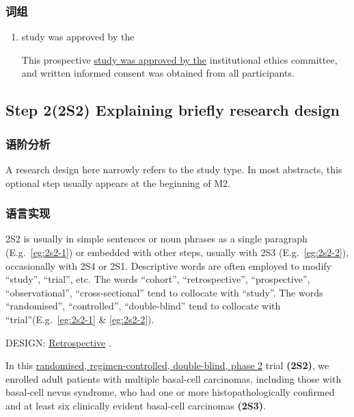 \documentclass[a4paper]{ctexbook}
\begin{document}
    \subsubsection{词组}

    \begin{enumerate}
      \item study was approved by the
      \begin{eg}
        This prospective \uline{study was approved by the} institutional ethics committee, and written informed consent was obtained from all participants.
      \end{eg}
    \end{enumerate}

  \subsection{Step 2(2S2) Explaining briefly research design}

    \subsubsection{语阶分析}

    A research design here narrowly refers to the study type. In most abstracts, this optional step usually appears at the beginning of M2.

    \subsubsection{语言实现}

    2S2 is usually in simple sentences or noun phrases as a single paragraph (E.g.~\ref{eg:2s2-1}) or embedded with other steps, usually with 2S3 (E.g.~\ref{eg:2s2-2}), occasionally with 2S4 or 2S1. Descriptive words are often employed to modify ``study'', ``trial'', etc. The words ``cohort'', ``retrospective'', ``prospective'', ``observational'', ``cross-sectional'' tend to collocate with ``study''. The words ``randomised'', ``controlled'', ``double-blind'' tend to collocate with ``trial''(E.g.~\ref{eg:2s2-1} \& \ref{eg:2s2-2}).

    \begin{eg}[label={eg:2s2-1}]{}
      DESIGN: \uline{Retrospective} .
    \end{eg}

    \begin{eg}[label={eg:2s2-2}]{}
      In this \uline{randomised, regimen-controlled, double-blind, phase 2} trial \textbf{(2S2)}, we enrolled adult patients with multiple basal-cell carcinomas, including those with basal-cell nevus syndrome, who had one or more histopathologically confirmed and at least six clinically evident basal-cell carcinomas \textbf{(2S3)}.
    \end{eg}
\end{document}
